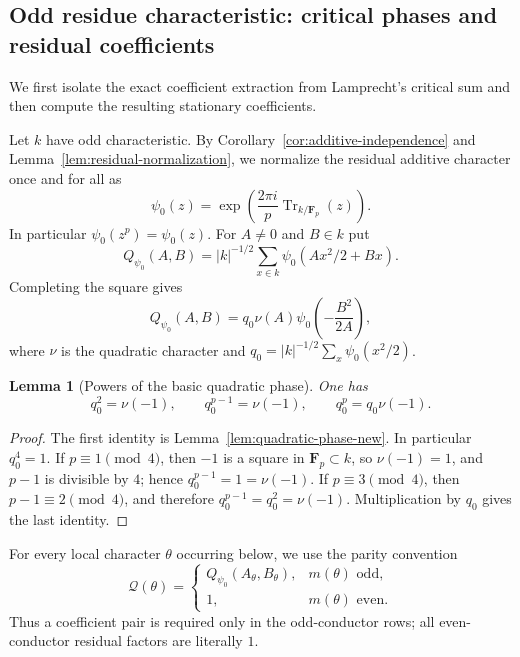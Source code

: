 \documentclass[11pt]{amsart}
\newtheorem{lemma}[theorem]{Lemma}
\theoremstyle{definition}
\theoremstyle{remark}
\newcommand{\F}{\mathbf F}
\newcommand{\Tr}{\operatorname{Tr}}
\begin{document}
\subsection{Odd residue characteristic: critical phases and residual coefficients}\label{sec:nonstable-odd}

We first isolate the exact coefficient extraction from Lamprecht's
critical sum and then compute the resulting stationary coefficients.

Let $k$ have odd characteristic.  By
Corollary~\ref{cor:additive-independence} and
Lemma~\ref{lem:residual-normalization}, we normalize the residual
additive character once and for all as
\[
 \psi_0(z)=\exp\!\left(\frac{2\pi i}{p}
             \Tr_{k/\F_p}(z)\right).
\]
In particular $\psi_0(z^p)=\psi_0(z)$.  For $A\ne0$ and $B\in k$ put
\begin{equation}\label{eq:QAB}
 Q_{\psi_0}(A,B)=
 |k|^{-1/2}\sum_{x\in k}\psi_0(Ax^2/2+Bx).
\end{equation}
Completing the square gives
\begin{equation}\label{eq:quadratic-phase}
 Q_{\psi_0}(A,B)
 =q_0\nu(A)\psi_0\!\left(-\frac{B^2}{2A}\right),
\end{equation}
where $\nu$ is the quadratic character and
$q_0=|k|^{-1/2}\sum_x\psi_0(x^2/2)$.

\begin{lemma}[Powers of the basic quadratic phase]
\label{lem:q0-powers}
One has
\begin{equation}\label{eq:q0-powers}
 q_0^2=\nu(-1),\qquad
 q_0^{p-1}=\nu(-1),\qquad
 q_0^p=q_0\nu(-1).
\end{equation}
\end{lemma}

\begin{proof}
The first identity is Lemma~\ref{lem:quadratic-phase-new}.  In
particular $q_0^4=1$.  If $p\equiv1\pmod4$, then $-1$ is a square in
$\F_p\subset k$, so $\nu(-1)=1$, and $p-1$ is divisible by $4$;
hence $q_0^{p-1}=1=\nu(-1)$.  If $p\equiv3\pmod4$, then
$p-1\equiv2\pmod4$, and therefore
$q_0^{p-1}=q_0^2=\nu(-1)$.  Multiplication by $q_0$ gives the last
identity.
\end{proof}

For every local character $\theta$ occurring below, we use the parity
convention
\begin{equation}\label{eq:odd-phase-parity-convention}
 \mathscr Q(\theta)=
 \begin{cases}
  Q_{\psi_0}(A_\theta,B_\theta),&m(\theta)\text{ odd},\\
  1,&m(\theta)\text{ even}.
 \end{cases}
\end{equation}
Thus a coefficient pair is required only in the odd-conductor rows; all
even-conductor residual factors are literally $1$.
\end{document}
